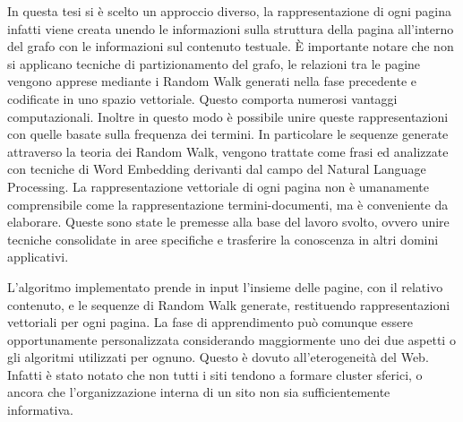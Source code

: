 In questa tesi si è scelto un approccio diverso, la rappresentazione di ogni pagina infatti viene creata unendo le informazioni sulla struttura della pagina all'interno del grafo con le informazioni sul contenuto testuale. È importante notare che non si applicano tecniche di partizionamento del grafo, le relazioni tra le pagine vengono apprese mediante i Random Walk generati nella fase precedente e codificate in uno spazio vettoriale. Questo comporta numerosi vantaggi computazionali. Inoltre in questo modo è possibile unire queste rappresentazioni con quelle basate sulla frequenza dei termini. In particolare le sequenze generate attraverso la teoria dei Random Walk, vengono trattate come frasi ed analizzate con tecniche di Word Embedding derivanti dal campo del Natural Language Processing. La rappresentazione vettoriale di ogni pagina non è umanamente comprensibile come la rappresentazione termini-documenti, ma è conveniente da elaborare. Queste sono state le premesse alla base del lavoro svolto, ovvero unire tecniche consolidate in aree specifiche e trasferire la conoscenza in altri domini applicativi.

L'algoritmo implementato prende in input l'insieme delle pagine, con il relativo contenuto, e le sequenze di Random Walk generate, restituendo rappresentazioni vettoriali per ogni pagina. La fase di apprendimento può comunque essere opportunamente personalizzata considerando maggiormente uno dei due aspetti o gli algoritmi utilizzati per ognuno. Questo è dovuto all'eterogeneità del Web. Infatti è stato notato che non tutti i siti tendono a formare cluster sferici, o ancora che l'organizzazione interna di un sito non sia sufficientemente informativa.